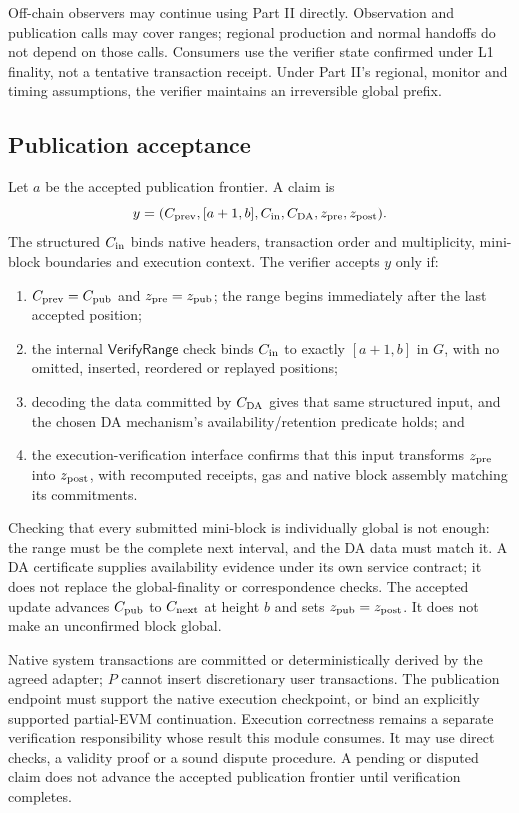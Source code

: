 \documentclass[11pt,a4paper]{article}
\newcommand{\api}[1]{\ensuremath{\mathsf{#1}}}
\begin{document}
Off-chain observers may continue using Part II directly. Observation and
publication calls may cover ranges; regional production and normal
handoffs do not depend on those calls. Consumers use the verifier state
confirmed under L1 finality, not a tentative transaction receipt.
Under Part II's regional, monitor and timing
assumptions, the verifier maintains an irreversible global prefix.

\subsection{Publication acceptance}
Let $a$ be the accepted publication frontier. A claim is
\[
 y=(C_{\rm prev},[a+1,b],C_{\rm in},C_{\rm DA},z_{\rm pre},z_{\rm post}).
\]
The structured $C_{\rm in}$ binds native headers, transaction order and
multiplicity, mini-block boundaries and execution context. The verifier
accepts $y$ only if:
\begin{enumerate}
\item $C_{\rm prev}=C_{\rm pub}$ and $z_{\rm pre}=z_{\rm pub}$; the
range begins immediately after the last accepted position;
\item the internal \api{VerifyRange} check binds $C_{\rm in}$ to exactly
$[a+1,b]$ in $G$, with no omitted, inserted, reordered or replayed positions;
\item decoding the data committed by $C_{\rm DA}$ gives that same
structured input, and the chosen DA mechanism's availability/retention
predicate holds; and
\item the execution-verification interface confirms that this input
transforms $z_{\rm pre}$ into $z_{\rm post}$, with recomputed receipts,
gas and native block assembly matching its commitments.
\end{enumerate}
Checking that every submitted mini-block is individually global is not
enough: the range must be the complete next interval, and the DA data
must match it. A DA certificate supplies availability evidence under its
own service contract; it does not replace the global-finality or
correspondence checks. The accepted update advances $C_{\rm pub}$ to
$C_{\rm next}$ at height $b$ and sets $z_{\rm pub}=z_{\rm post}$.
It does not make an unconfirmed block global.

Native system transactions are committed or deterministically derived by
the agreed adapter; $P$ cannot insert discretionary user transactions.
The publication endpoint must support the native execution checkpoint,
or bind an explicitly supported partial-EVM continuation. Execution
correctness remains a separate verification responsibility whose result
this module consumes. It may use direct checks, a validity proof or a
sound dispute procedure. A pending or disputed claim does not advance
the accepted publication frontier until verification completes.
\end{document}

